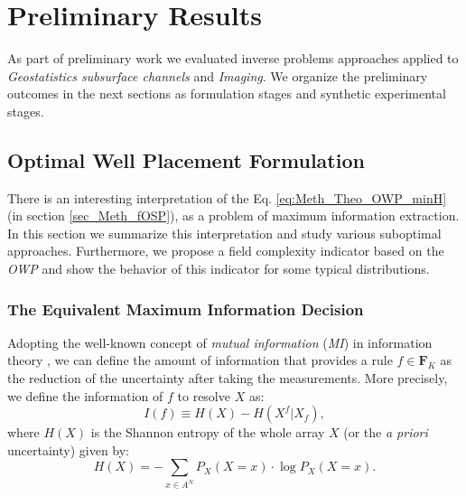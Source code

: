 \chapter{Preliminary Results}
\label{Pre_Results}

As part of preliminary work we evaluated inverse problems approaches applied to \emph{Geostatistics subsurface channels} and \emph{Imaging}. We organize the preliminary outcomes in the next sections as formulation stages and synthetic experimental stages.


\section{Optimal Well Placement Formulation}
\label{sec_OWP_Form}
There is an interesting interpretation of the Eq. \eqref{eq:Meth_Theo_OWP_minH} (in section \ref{sec_Meth_fOSP}), as a problem of maximum information extraction. In this section we summarize this interpretation and study various suboptimal approaches. Furthermore, we propose a field complexity indicator based on the \emph{OWP} and show the behavior of this indicator for some typical distributions.
\subsection{The Equivalent Maximum Information Decision}


Adopting the well-known concept of \emph{mutual information} (\emph{MI}) in information theory \cite{cover2006elements}, we can define the amount of information that provides a rule $f \in \mathbf{F}_K$ as the reduction of the uncertainty after taking the measurements. More precisely, we define the information of $f$ to resolve $X$ as: 
\begin{equation}\label{eq:Meth_Theo_If}
	I(f) \equiv H(X) - H(X^f|X_{f}) , 
\end{equation} 
where $H(X)$ is the Shannon entropy of the whole array $X$ (or the \emph{a priori} uncertainty) given by: 
\begin{equation}\label{eq:Meth_Theo_HX}
	H(X)  = -  \sum_{ x  \in A^{N}} P_{X} (X = x) \cdot \log P_{X} (X = x) .
\end{equation} 

